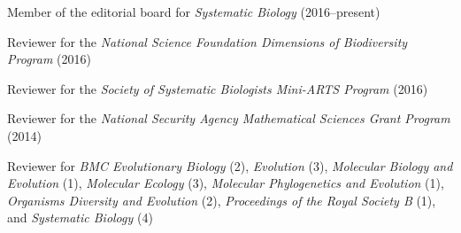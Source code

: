 \myHangIndent
Member of the editorial board for \emph{Systematic Biology} (2016--present)

\myHangIndent
Reviewer for the
    \emph{National Science Foundation Dimensions of Biodiversity Program} (2016)

\myHangIndent
Reviewer for the
    \emph{Society of Systematic Biologists Mini-ARTS Program} (2016)

\myHangIndent
Reviewer for the
    \emph{National Security Agency Mathematical Sciences Grant Program} (2014)


\myHangIndent
Reviewer for
    \emph{BMC Evolutionary Biology} (2),
    \emph{Evolution} (3),
    \emph{Molecular Biology and Evolution} (1),
    \emph{Molecular Ecology} (3),
    \emph{Molecular Phylogenetics and Evolution} (1),
    \emph{Organisms Diversity and Evolution} (2),
    \emph{Proceedings of the Royal Society B} (1),
    and
    \emph{Systematic Biology} (4)


